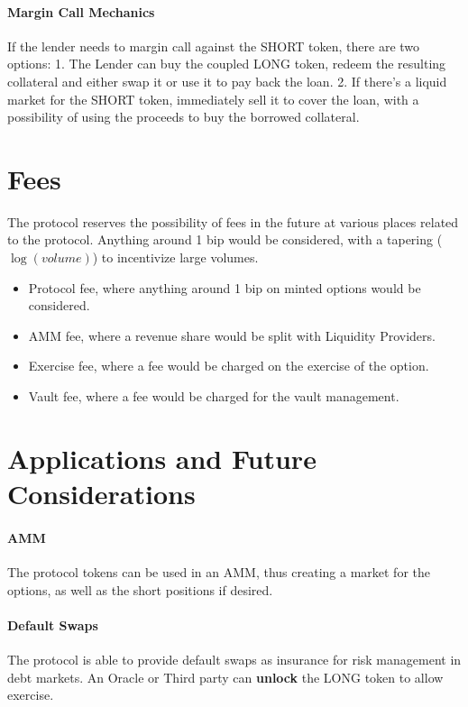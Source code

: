 \paragraph*{Margin Call Mechanics}
If the lender needs to margin call against the SHORT token, there are two options: 1. The Lender can buy the coupled LONG token, redeem the resulting collateral and either swap it or use it to pay back the loan. 2. If there's a liquid market for the SHORT token, immediately sell it to cover the loan, with a possibility of using the proceeds to buy the borrowed collateral.

\section{Fees}
The protocol reserves the possibility of fees in the future at various places related to the protocol.
Anything around 1 bip would be considered, with a tapering ($\log(volume)$) to incentivize large volumes.
\begin{itemize}
  \setlength{\itemsep}{0pt}
  \setlength{\parskip}{0pt}
  \item Protocol fee, where anything around 1 bip on minted options would be considered.
  \item AMM fee, where a revenue share would be split with Liquidity Providers.
  \item Exercise fee, where a fee would be charged on the exercise of the option.
  \item Vault fee, where a fee would be charged for the vault management.
\end{itemize}


\section{Applications and Future Considerations}
\paragraph*{AMM}
The protocol tokens can be used in an AMM, thus creating a market for the options, as well as the short positions if desired. 

\paragraph*{Default Swaps}

The protocol is able to provide default swaps as insurance for risk management in debt markets. 
An Oracle or Third party can \textbf{unlock} the LONG token to allow exercise.

